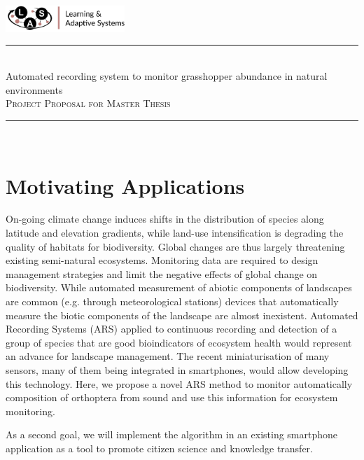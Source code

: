 \documentclass[paper=a4, fontsize=11pt]{scrartcl}
\newcommand{\horrule}[1]{\rule{\linewidth}{#1}}
\begin{document}
\includegraphics[height=1.0cm]{lascropped}%
\hfill%
{
\centering
\normalfont \normalsize 
\horrule{0.5pt} \\[0.2cm] 
\huge Automated recording system to monitor grasshopper abundance in natural environments
\\[0.3cm]
\normalfont \normalsize 
\textsc{Project Proposal for Master Thesis}
\horrule{2pt} \\[0.6cm] 
}
\section*{Motivating Applications}
On-going climate change induces shifts in the distribution of species along latitude and elevation gradients, while land-use intensification is degrading the quality of habitats for biodiversity. Global changes are thus largely threatening existing semi-natural ecosystems. Monitoring data are required to design management strategies and limit the negative effects of global change on biodiversity. While automated measurement of abiotic components of landscapes are common (e.g. through meteorological stations) devices that automatically measure the biotic components of the landscape are almost inexistent.
Automated Recording Systems (ARS) applied to continuous recording and detection of a group of species that are good bioindicators of ecosystem health would represent an advance for landscape management. The recent miniaturisation of many sensors, many of them being integrated in smartphones, would allow developing this technology. Here, we propose a novel ARS method to monitor automatically composition of orthoptera from sound and use this information for ecosystem monitoring.

As a second goal, we will implement the algorithm in an existing smartphone application as a tool to promote citizen science and knowledge transfer.

\end{document}
